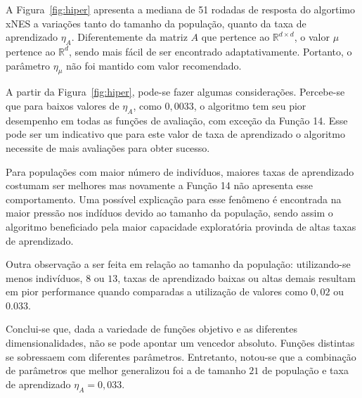 A Figura~\ref{fig:hiper} apresenta a mediana de 51 rodadas de resposta do algortimo xNES a variações tanto do
tamanho da população, quanto da taxa de aprendizado $\eta_A$.
Diferentemente da matriz $A$ que pertence ao $\mathbb{R}^{d \times d}$, o valor $\mu$ pertence ao $\mathbb{R}^{d}$, sendo
mais fácil de ser encontrado adaptativamente.
Portanto, o parâmetro $\eta_{\mu}$ não foi mantido com valor recomendado.

A partir da Figura~\ref{fig:hiper}, pode-se fazer algumas considerações.
Percebe-se que para baixos valores de $\eta_A$, como $0,0033$, o algoritmo tem seu pior desempenho em todas as funções
de avaliação, com exceção da Função 14.
Esse pode ser um indicativo que para este valor de taxa de aprendizado o algoritmo necessite de mais avaliações para
obter sucesso.

Para populações com maior número de indivíduos, maiores taxas de aprendizado costumam ser melhores mas novamente a Função 14
não apresenta esse comportamento.
Uma possível explicação para esse fenômeno é encontrada na maior pressão nos indíduos devido ao tamanho da população, sendo
assim o algoritmo beneficiado pela maior capacidade exploratória provinda de altas taxas de aprendizado.

Outra observação a ser feita em relação ao tamanho da população: utilizando-se menos indivíduos, $8$ ou $13$, taxas de
aprendizado baixas ou altas demais resultam em pior performance quando comparadas a utilização de valores como $0,02$ ou
$0.033$.

Conclui-se que, dada a variedade de funções objetivo e as diferentes dimensionalidades, não se pode apontar um vencedor absoluto.
Funções distintas se sobressaem com diferentes parâmetros.
Entretanto, notou-se que a combinação de parâmetros que melhor generalizou foi a de tamanho $21$ de população e taxa de
aprendizado $\eta_A = 0,033$.

